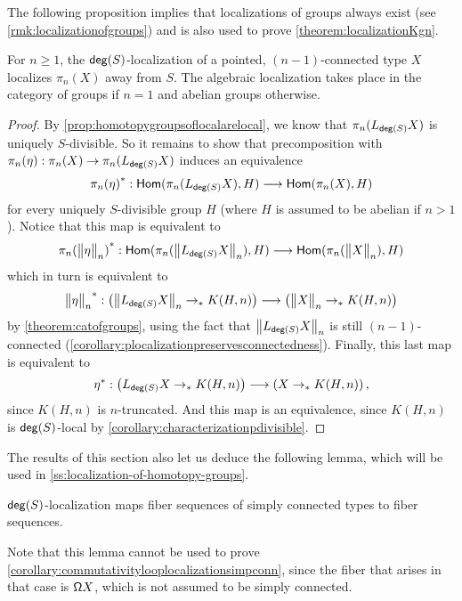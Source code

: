 The following proposition implies that localizations of groups always exist
(see \cref{rmk:localizationofgroups})
and is also used to prove \cref{theorem:localizationKgn}.

\begin{prop}\label{lemma:localizationlocalizesfirst}
    For $n \geq 1$,
    the $\degg(S)$-localization of a pointed, $(n-1)$-connected type $X$ localizes $\pi_n(X)$ away from $S$.
    The algebraic localization takes place in the category of groups if $n = 1$ and
    abelian groups otherwise.
\end{prop}

\begin{proof}
    By \cref{prop:homotopygroupsoflocalarelocal},
    we know that $\pi_n(L_{\degg(S)} X)$ is uniquely $S$-divisible.
    So it remains to show that precomposition with $\pi_n(\eta) : \pi_n(X) \to \pi_n(L_{\degg(S)} X)$
    induces an equivalence
    \[
        \precomp{\pi_n(\eta)} : \Hom(\pi_n(L_{\degg(S)} X),  H) \lra \Hom(\pi_n(X), H)
    \]
    for every uniquely $S$-divisible group $H$ (where $H$ is assumed to be abelian if $n>1$).
    Notice that this map is equivalent to 
    \[
        \precomp{\pi_n(\ttrunc{n}{\eta})} : \Hom(\pi_n(\ttrunc{n}{L_{\degg(S)} X}),  H) \lra \Hom(\pi_n(\ttrunc{n}{X}), H)
    \]
    which in turn is equivalent to
    \[
        \precomp{\ttrunc{n}{\eta}} : \left( \ttrunc{n}{L_{\degg(S)}X} \pto K(H, n) \right) \lra \left( \ttrunc{n}{X} \pto K(H, n) \right) 
    \]
    by \cref{theorem:catofgroups}, using the fact that $\ttrunc{n}{L_{\degg(S)}X}$ is still $(n-1)$-connected (\cref{corollary:plocalizationpreservesconnectedness}).
    Finally, this last map is equivalent to
    \[
        \precomp{\eta} : \left( L_{\degg(S)}X \pto K(H, n) \right) \lra \left( X \pto K(H, n) \right),
    \]
    since $K(H,n)$ is $n$-truncated.
    And this map is an equivalence, since $K(H,n)$ is $\degg(S)$-local by \cref{corollary:characterizationpdivisible}.
\end{proof}

The results of this section also let us deduce the following lemma,
which will be used in \cref{ss:localization-of-homotopy-groups}.

\begin{lem}\label{lemma:lex}
    $\degg(S)$-localization maps fiber sequences of simply connected types to fiber sequences.
\end{lem}

Note that this lemma cannot be used to prove \cref{corollary:commutativitylooplocalizationsimpconn},
since the fiber that arises in that case is $\loopspacesym X$, which is not assumed to be
simply connected.

